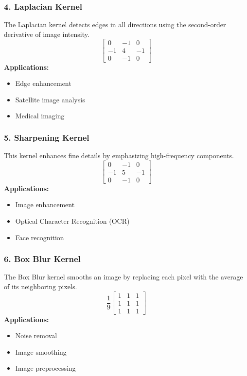\documentclass[11pt]{article}
\begin{document}
\subsubsection*{4. Laplacian Kernel}
The Laplacian kernel detects edges in all directions using the second-order derivative of image intensity. 
$$ \begin{bmatrix} 0 & -1 & 0 \\ -1 & 4 & -1 \\ 0 & -1 & 0 \end{bmatrix} $$
\textbf{Applications:}
\begin{itemize}
    \item Edge enhancement 
    \item Satellite image analysis 
    \item Medical imaging 
\end{itemize}

\subsubsection*{5. Sharpening Kernel}
This kernel enhances fine details by emphasizing high-frequency components. 
$$ \begin{bmatrix} 0 & -1 & 0 \\ -1 & 5 & -1 \\ 0 & -1 & 0 \end{bmatrix} $$
\textbf{Applications:}
\begin{itemize}
    \item Image enhancement 
    \item Optical Character Recognition (OCR) 
    \item Face recognition 
\end{itemize}

\subsubsection*{6. Box Blur Kernel}
The Box Blur kernel smooths an image by replacing each pixel with the average of its neighboring pixels. 
$$ \frac{1}{9} \begin{bmatrix} 1 & 1 & 1 \\ 1 & 1 & 1 \\ 1 & 1 & 1 \end{bmatrix} $$
\textbf{Applications:}
\begin{itemize}
    \item Noise removal 
    \item Image smoothing 
    \item Image preprocessing 
\end{itemize}
\end{document}
